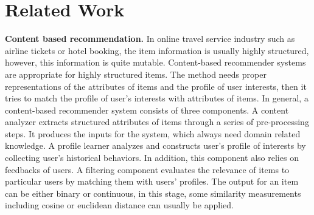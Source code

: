 \documentclass{sig-alternate-05-2015}
\begin{document}
\section{Related Work}
\textbf{Content based recommendation.} In online travel service industry such as airline tickets or hotel booking, the item information is usually highly structured, however, this information is quite mutable. Content-based recommender systems \cite{tech:cset}\cite{lops:handbook}are appropriate for highly structured items. The method needs proper representations of the attributes of items and the profile of user interests, then it tries to match  the profile of user's interests with attributes of items. In general, a content-based recommender system consists of three components. A content analyzer extracts structured attributes of items through a series of pre-processing steps. It produces the inputs for the system, which always need domain related knowledge. A profile learner analyzes and constructs user's profile of interests by collecting user's historical behaviors. In addition, this component also relies on feedbacks of users. A filtering component evaluates the relevance of items to particular users by matching them with users' profiles. The output for an item can be either binary or continuous, in this stage, some similarity measurements including cosine or euclidean distance can usually be applied.\par
\end{document}
